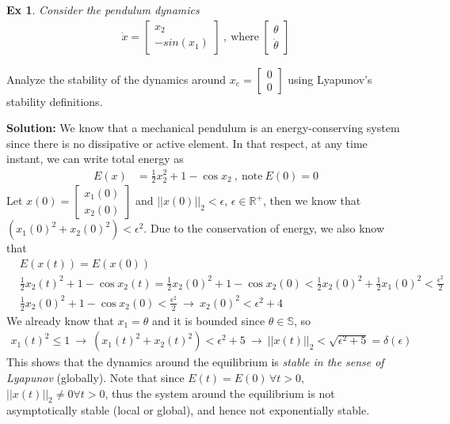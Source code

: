 \documentclass[twoside]{article}
\newtheorem{exmp}[theorem]{Ex}
\begin{document}
\begin{exmp}
    Consider the pendulum dynamics
    \begin{align*}
    \dot{x} = \begin{bmatrix} x_2 \\ -sin(x_1)\end{bmatrix} \ , \ \mathrm{where} \ \begin{bmatrix}  \theta \\ \dot{\theta} \end{bmatrix}
\end{align*}
\end{exmp}
Analyze the stability of the dynamics around $x_e = \begin{bmatrix} 0 \\ 0 \end{bmatrix}$ using Lyapunov's stability definitions.

\textbf{Solution:} We know that a mechanical pendulum is an
energy-conserving system since there is no dissipative or active element. In that respect, at any time instant, we can write total energy as 
%
\begin{align*}
E(x) &= \frac{1}{2} x_2^2 + 1 - \cos{x_2}  \ , \ \mathrm{note} \ E(0) = 0
\end{align*}
%
Let $x(0) = \begin{bmatrix} x_1(0) \\ x_2(0) \end{bmatrix}$ and $|| x(0) ||_2 < \epsilon , \, \epsilon \in \mathbb{R}^+ $, then we know that $ (x_1(0)^2 + x_2(0)^2) < \epsilon^2 $. Due to the conservation of energy, we also know that
%
\begin{align*}
&E(x(t)) = E(x(0)) \\
&\frac{1}{2} x_2(t)^2 + 1 - \cos{x_2(t)} 
= 
\frac{1}{2} x_2(0)^2 + 1 - \cos{x_2(0)} < \frac{1}{2} x_2(0)^2 + \frac{1}{2} x_1(0)^2 < \frac{\epsilon^2}{2}
\\
&\frac{1}{2} x_2(0)^2 + 1 - \cos{x_2(0)} < \frac{\epsilon^2}{2} 
\ \rightarrow \ x_2(0)^2 < \epsilon^2 + 4
\end{align*}
%
We already know that $x_1 = \theta$ and it is bounded since $\theta \in \mathbb{S}$, so 
%
\begin{align*}
x_1(t)^2 \leq 1 \ \rightarrow \ ( x_1(t)^2 + x_2(t)^2 ) < \epsilon^2 + 5 \ \rightarrow \ || x(t) ||_2 < \sqrt{\epsilon^2 + 5} = \delta(\epsilon)
\end{align*}
%
This shows that the dynamics around the equilibrium is \textit{stable in the sense of Lyapunov} (globally). Note that 
since $E(t) = E(0) \, \forall t >0$, $|| x(t) ||_2 \neq 0 \forall t >0$, thus the system around the equilibrium is not asymptotically
stable (local or global), and hence not exponentially stable. 
\end{document}
